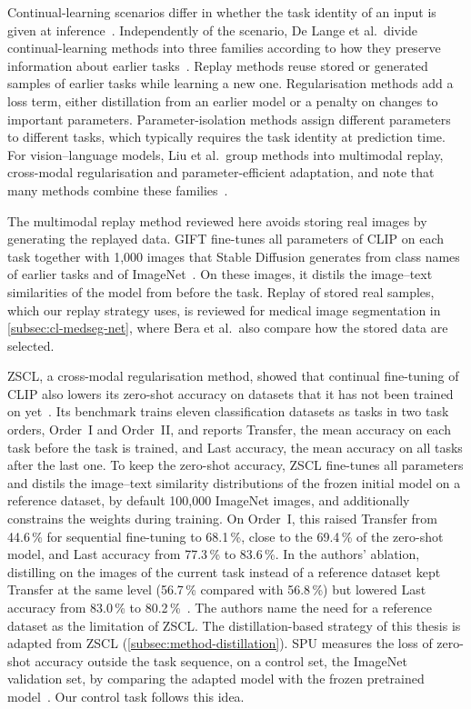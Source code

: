 Continual-learning scenarios differ in whether the task identity of an input is given at inference~\cite{van_de_Ven_2025}.
Independently of the scenario, De Lange et al.\ divide continual-learning methods into three families according to how they preserve information about earlier tasks~\cite[Sec.~3]{delange2022}.
Replay methods reuse stored or generated samples of earlier tasks while learning a new one.
Regularisation methods add a loss term, either distillation from an earlier model or a penalty on changes to important parameters.
Parameter-isolation methods assign different parameters to different tasks, which typically requires the task identity at prediction time.
For vision--language models, Liu et al.\ group methods into multimodal replay, cross-modal regularisation and parameter-efficient adaptation, and note that many methods combine these families~\cite[Sec.~4]{liu2026continuallearningvlmssurvey}.

The multimodal replay method reviewed here avoids storing real images by generating the replayed data.
GIFT fine-tunes all parameters of CLIP on each task together with 1{,}000 images that Stable Diffusion generates from class names of earlier tasks and of ImageNet~\cite{wu2024gift}.
On these images, it distils the image--text similarities of the model from before the task.
Replay of stored real samples, which our replay strategy uses, is reviewed for medical image segmentation in \cref{subsec:cl-medseg-net}, where Bera et al.\ also compare how the stored data are selected.

ZSCL, a cross-modal regularisation method, showed that continual fine-tuning of CLIP also lowers its zero-shot accuracy on datasets that it has not been trained on yet~\cite{zheng2023preventingzeroshottransferdegradation}.
Its benchmark trains eleven classification datasets as tasks in two task orders, Order~I and Order~II, and reports Transfer, the mean accuracy on each task before the task is trained, and Last accuracy, the mean accuracy on all tasks after the last one.
To keep the zero-shot accuracy, ZSCL fine-tunes all parameters and distils the image--text similarity distributions of the frozen initial model on a reference dataset, by default 100{,}000 ImageNet images, and additionally constrains the weights during training.
On Order~I, this raised Transfer from 44.6\,\% for sequential fine-tuning to 68.1\,\%, close to the 69.4\,\% of the zero-shot model, and Last accuracy from 77.3\,\% to 83.6\,\%.
In the authors' ablation, distilling on the images of the current task instead of a reference dataset kept Transfer at the same level (56.7\,\% compared with 56.8\,\%) but lowered Last accuracy from 83.0\,\% to 80.2\,\%~\cite[Table~1b]{zheng2023preventingzeroshottransferdegradation}.
The authors name the need for a reference dataset as the limitation of ZSCL.
The distillation-based strategy of this thesis is adapted from ZSCL (\cref{subsec:method-distillation}).
SPU measures the loss of zero-shot accuracy outside the task sequence, on a control set, the ImageNet validation set, by comparing the adapted model with the frozen pretrained model~\cite{Zhang_2024_CVPR}.
Our control task follows this idea.


